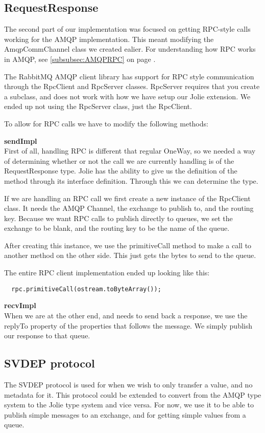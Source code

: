 \subsection{RequestResponse}
The second part of our implementation was focused on getting RPC-style calls working for the AMQP implementation. This meant modifying the AmqpCommChannel class we created ealier. For understanding how RPC works in AMQP, see \ref{subsubsec:AMQPRPC} on page \pageref{subsubsec:AMQPRPC}.

The RabbitMQ AMQP client library has support for RPC style communication through the RpcClient and RpcServer classes. RpcServer requires that you create a subclass, and does not work with how we have setup our Jolie extension. We ended up not using the RpcServer class, just the RpcClient.

To allow for RPC calls we have to modify the following methods:

\noindent\textbf{sendImpl}\\
First of all, handling RPC is different that regular OneWay, so we needed a way of determining whether or not the call we are currently handling is of the RequestResponse type. Jolie has the ability to give us the definition of the method through its interface definition. Through this we can determine the type.

If we are handling an RPC call we first create a new instance of the RpcClient class. It needs the AMQP Channel, the exchange to publish to, and the routing key. Because we want RPC calls to publish directly to queues, we set the exchange to be blank, and the routing key to be the name of the queue.

After creating this instance, we use the primitiveCall method to make a call to another method on the other side. This just gets the bytes to send to the queue.

The entire RPC client implementation ended up looking like this:
\begin{lstlisting}
  rpc.primitiveCall(ostream.toByteArray());
\end{lstlisting}

\noindent\textbf{recvImpl}\\
When we are at the other end, and needs to send back a response, we use the replyTo property of the properties that follows the message. We simply publish our response to that queue.


\subsection{SVDEP protocol}
\label{subsec:SVDEP} %
The SVDEP protocol is used for when we wish to only transfer a value, and no metadata for it. This protocol could be extended to convert from the AMQP type system to the Jolie type system and vice versa. For now, we use it to be able to publish simple messages to an exchange, and for getting simple values from a queue.

